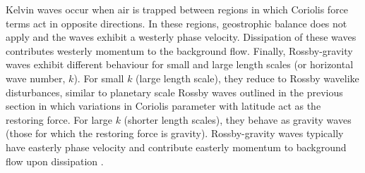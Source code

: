 Kelvin waves occur when air is trapped between regions in which Coriolis force terms act in opposite directions. In these regions, geostrophic balance does not apply and the waves exhibit a westerly phase velocity. Dissipation of these waves contributes westerly momentum to the background flow. Finally, Rossby-gravity waves exhibit different behaviour for small and large length scales (or horizontal wave number, $k$). For small $k$ (large length scale), they reduce to Rossby wavelike disturbances, similar to planetary scale Rossby waves outlined in the previous section in which variations in Coriolis parameter with latitude act as the restoring force. For large $k$ (shorter length scales), they behave as gravity waves (those for which the restoring force is gravity). Rossby-gravity waves typically have easterly phase velocity and contribute easterly momentum to background flow upon dissipation \citep{andrewsPlanetary1976}.

